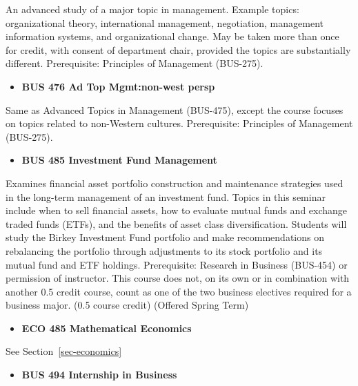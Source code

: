\documentclass[
  letterpaper,
]{scrbook}
\providecommand{\tightlist}{%
  \setlength{\itemsep}{0pt}\setlength{\parskip}{0pt}}
\begin{document}
An advanced study of a major topic in management. Example topics:
organizational theory, international management, negotiation, management
information systems, and organizational change. May be taken more than
once for credit, with consent of department chair, provided the topics
are substantially different. Prerequisite: Principles of Management
(BUS-275).

\begin{itemize}
\tightlist
\item
  \textbf{BUS 476 Ad Top Mgmt:non-west persp}
\end{itemize}

Same as Advanced Topics in Management (BUS-475), except the course
focuses on topics related to non-Western cultures. Prerequisite:
Principles of Management (BUS-275).

\begin{itemize}
\tightlist
\item
  \textbf{BUS 485 Investment Fund Management}
\end{itemize}

Examines financial asset portfolio construction and maintenance
strategies used in the long-term management of an investment fund.
Topics in this seminar include when to sell financial assets, how to
evaluate mutual funds and exchange traded funds (ETFs), and the benefits
of asset class diversification. Students will study the Birkey
Investment Fund portfolio and make recommendations on rebalancing the
portfolio through adjustments to its stock portfolio and its mutual fund
and ETF holdings. Prerequisite: Research in Business (BUS-454) or
permission of instructor. This course does not, on its own or in
combination with another 0.5 credit course, count as one of the two
business electives required for a business major. (0.5 course credit)
(Offered Spring Term)

\begin{itemize}
\tightlist
\item
  \textbf{ECO 485 Mathematical Economics}
\end{itemize}

See Section~\ref{sec-economics}

\begin{itemize}
\tightlist
\item
  \textbf{BUS 494 Internship in Business}
\end{itemize}
\end{document}
